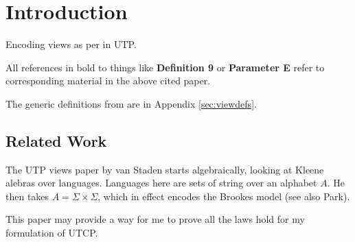 \section{Introduction}

Encoding views as per \cite{conf/popl/Dinsdale-YoungBGPY13}
in UTP.

All references in bold to things
like \textbf{Definition 9} or \textbf{Parameter E} refer to corresponding material
in the above cited paper.

The generic definitions from\cite{conf/popl/Dinsdale-YoungBGPY13}
are in Appendix \ref{sec:viewdefs}.


\subsection{Related Work}

The UTP views paper by van Staden\cite{DBLP:conf/utp/Staden14}
starts algebraically, looking at Kleene alebras over languages.
Languages here are sets of string over an alphabet $A$.
He then takes $A =\Sigma\times\Sigma$,
which in effect encodes the Brookes model\cite{DBLP:journals/iandc/Brookes96}
(see also Park\cite{conf/ac/Park79}).

This paper may provide a way for me to prove all the laws hold for
my formulation of UTCP.
